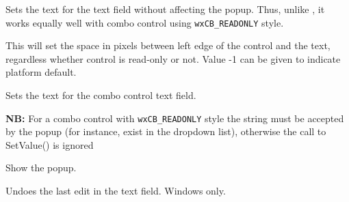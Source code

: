 



\label{wxcomboctrlsettext}


Sets the text for the text field without affecting the
popup. Thus, unlike , it works
equally well with combo control using {\tt wxCB\_READONLY} style.


\label{wxcomboctrlsettextindent}


This will set the space in pixels between left edge of the control and the
text, regardless whether control is read-only or not. Value -1 can be
given to indicate platform default.


\label{wxcomboctrlsetvalue}


Sets the text for the combo control text field.

{\bf NB:} For a combo control with {\tt wxCB\_READONLY} style the
string must be accepted by the popup (for instance, exist in the dropdown
list), otherwise the call to SetValue() is ignored


\label{wxcomboctrlshowpopup}


Show the popup.


\label{wxcomboctrlundo}


Undoes the last edit in the text field. Windows only.
